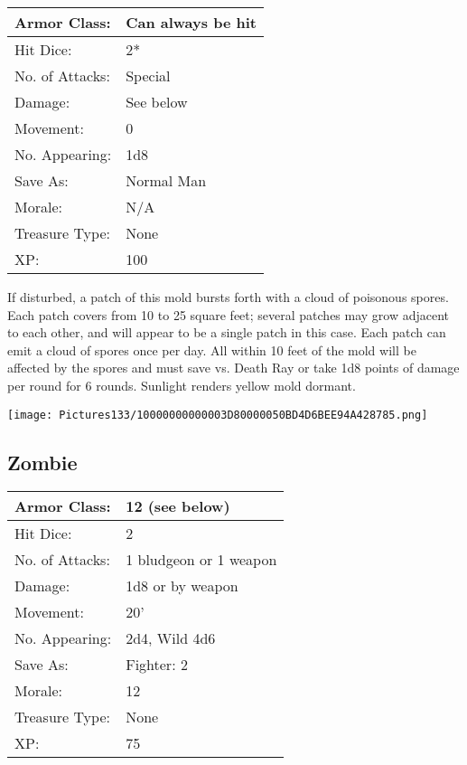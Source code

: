 \documentclass[a4paper,twoside,openany,10pt]{book}
\begin{document}
\begin{multicols}{2}
\begin{tabularx}{0.50\textwidth}{@{}lX@{}}
Armor Class: & Can always be hit \\\hline
Hit Dice: & 2*  \\\hline
No. of Attacks: & Special \\\hline
Damage: & See below \\\hline
Movement: & 0 \\\hline
No. Appearing: & 1d8 \\\hline
Save As: & Normal Man \\\hline
Morale: & N/A \\\hline
Treasure Type: & None \\\hline
XP: & 100 \\\hline
\end{tabularx}

If disturbed, a patch of this mold bursts forth with a cloud of poisonous spores. Each patch covers from 10 to 25 square feet; several patches may grow adjacent to each other, and will appear to be a single patch in this case. Each patch can emit a cloud of spores once per day. All within 10 feet of the mold will be affected by the spores and must save vs. Death Ray or take 1d8 points of damage per round for 6 rounds. Sunlight renders yellow mold dormant.

\begin{center} \texttt{[image: Pictures133/10000000000003D80000050BD4D6BEE94A428785.png]} \end{center}

\subsection*{Zombie}\label{zombie}

\begin{tabularx}{0.50\textwidth}{@{}lX@{}}
Armor Class: & 12 (see below) \\\hline
Hit Dice: & 2 \\\hline
No. of Attacks: & 1 bludgeon or 1 weapon \\\hline
Damage: & 1d8 or by weapon \\\hline
Movement: & 20' \\\hline
No. Appearing: & 2d4, Wild 4d6 \\\hline
Save As: & Fighter: 2 \\\hline
Morale: & 12 \\\hline
Treasure Type: & None \\\hline
XP: & 75 \\\hline
\end{tabularx}\medskip


\end{multicols}
\end{document}
